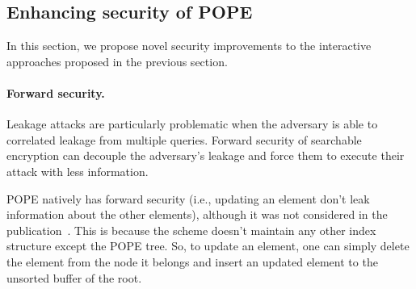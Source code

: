 
\subsection{Enhancing security of POPE}
In this section, we propose novel security improvements to the interactive approaches proposed in the previous section. 

\iffalse
Many of these defenses are designed to defeat leakage inference attacks.  The first approach is \emph{modularity} in the
sense of modular order-preserving encryption (M-OPE)~\cite{C:BolCheONe11}.  The
idea of M-OPE is to apply a secret random offset modulo the largest possible
message to a message before encrypting it (the secret random offset is chosen
once and fixed in the secret key), so that everything gets ``shifted.''
Since attacks still seem to apply to M-OPE, we propose to investigate more
fine-grained modularity as a defense. 

\paragraph{Random offset for each digit.}
We propose \emph{digit-modular} OPE (DM-OPE) where there is a
secret modular offset applied to each digit.  The base in which the data is
written could even itself be secret.  It becomes more complicated to make range
queries with DM-OPE, as it requires an exponential number of queries in the
number of ``wrap around'' digits in the query.  However, we propose to
investigate approximating the queries efficiently (with some false positives
that the client can filter out).
\fi

\paragraph{Forward security.} Leakage attacks are particularly problematic when
the adversary is able to correlated leakage from multiple queries.  Forward
security of searchable encryption can decouple the adversary's leakage and force
them to execute their attack with less information.  

POPE natively has forward security (i.e., updating an element don't leak
information about the other elements), although it was not considered in the
publication~\cite{CCS:RACY16}.  This is because the scheme doesn't maintain any
other index structure except the POPE tree. So, to update an element, one can
simply delete the element from the node it belongs and insert an updated
element to the unsorted buffer of the root. 

